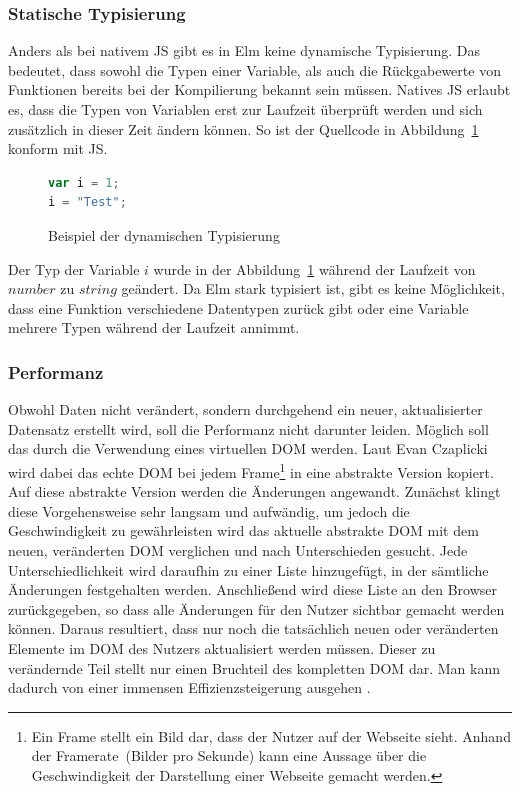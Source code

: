 \subsubsection{Statische Typisierung}
\label{sec:Statische Typisierung}
Anders als bei nativem \ac{JS} gibt es in Elm keine dynamische Typisierung. Das bedeutet, dass sowohl die Typen einer Variable, als auch die Rückgabewerte von Funktionen bereits bei der Kompilierung bekannt sein müssen. Natives \ac{JS} erlaubt es, dass die Typen von Variablen erst zur Laufzeit überprüft werden und sich zusätzlich in dieser Zeit ändern können. So ist der Quellcode in Abbildung~\ref{fig:dynamische-typisierung} konform mit \ac{JS}.
\begin{figure}[ht]
\begin{lstlisting}[language=JavaScript]
var i = 1;
i = "Test";
\end{lstlisting}
\caption{Beispiel der dynamischen Typisierung}\label{fig:dynamische-typisierung}
\end{figure}
Der Typ der Variable $i$ wurde in der Abbildung~\ref{fig:dynamische-typisierung} während der Laufzeit von $number$ zu $string$ geändert. Da Elm stark typisiert ist, gibt es keine Möglichkeit, dass eine Funktion verschiedene Datentypen zurück gibt oder eine Variable mehrere Typen während der Laufzeit annimmt.


\subsubsection{Performanz}
\label{sec:Performanz}
Obwohl Daten nicht verändert, sondern durchgehend ein neuer, aktualisierter Datensatz erstellt wird, soll die Performanz nicht darunter leiden. Möglich soll das durch die Verwendung eines virtuellen \ac{DOM} werden.
Laut Evan Czaplicki wird dabei das echte \ac{DOM} bei jedem \glqq Frame\grqq\footnote{Ein Frame stellt ein Bild dar, dass der Nutzer auf der Webseite sieht. Anhand der \glqq Framerate\grqq~(Bilder pro Sekunde) kann eine Aussage über die Geschwindigkeit der Darstellung einer Webseite gemacht werden.} in eine abstrakte Version kopiert. Auf diese abstrakte Version werden die Änderungen angewandt. Zunächst klingt diese Vorgehensweise sehr langsam und aufwändig, um jedoch die Geschwindigkeit zu gewährleisten wird das aktuelle abstrakte \ac{DOM} mit dem neuen, veränderten \ac{DOM} verglichen und nach Unterschieden gesucht. Jede Unterschiedlichkeit wird daraufhin zu einer Liste hinzugefügt, in der sämtliche Änderungen festgehalten werden. Anschließend wird diese Liste an den Browser zurückgegeben, so dass alle Änderungen für den Nutzer sichtbar gemacht werden können. Daraus resultiert, dass nur noch die tatsächlich neuen oder veränderten Elemente im \ac{DOM} des Nutzers aktualisiert werden müssen. Dieser zu verändernde Teil stellt nur einen Bruchteil des kompletten \ac{DOM} dar. Man kann dadurch von einer immensen Effizienzsteigerung ausgehen \cite[Vgl.]{web-programming-restarted}.

